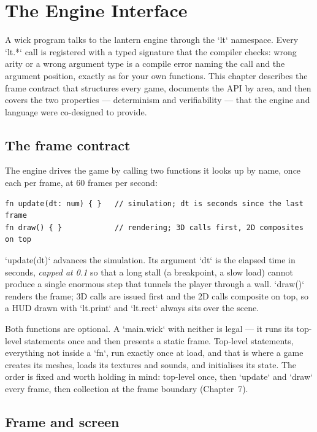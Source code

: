 \chapter{The Engine Interface}

A wick program talks to the lantern engine through the `lt` namespace. Every
`lt.*` call is registered with a typed signature that the compiler checks:
wrong arity or a wrong argument type is a compile error naming the call and
the argument position, exactly as for your own functions. This chapter
describes the frame contract that structures every game, documents the API by
area, and then covers the two properties --- determinism and verifiability ---
that the engine and language were co-designed to provide.

\section{The frame contract}

The engine drives the game by calling two functions it looks up by name, once
each per frame, at 60 frames per second:

\begin{lstlisting}[language=wick]
fn update(dt: num) { }   // simulation; dt is seconds since the last frame
fn draw() { }            // rendering; 3D calls first, 2D composites on top
\end{lstlisting}

\noindent
`update(dt)` advances the simulation. Its argument `dt` is the elapsed time in
seconds, \emph{capped at 0.1} so that a long stall (a breakpoint, a slow load)
cannot produce a single enormous step that tunnels the player through a wall.
`draw()` renders the frame; 3D calls are issued first and the 2D calls
composite on top, so a HUD drawn with `lt.print` and `lt.rect` always sits
over the scene.

Both functions are optional. A `main.wick` with neither is legal --- it runs
its top-level statements once and then presents a static frame. Top-level
statements, everything not inside a `fn`, run exactly once at load, and that
is where a game creates its meshes, loads its textures and sounds, and
initialises its state. The order is fixed and worth holding in mind: top-level
once, then `update` and `draw` every frame, then collection at the frame
boundary (Chapter~7).

\section{Frame and screen}

